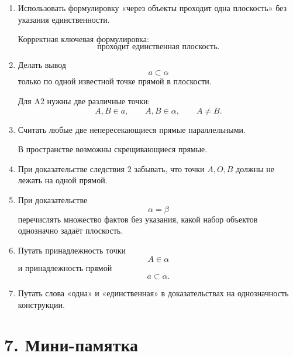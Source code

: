 \documentclass[a4paper,12pt]{article}
\begin{document}
\begin{enumerate}
    \item
    Использовать формулировку
    «через объекты проходит одна плоскость»
    без указания единственности.

    Корректная ключевая формулировка:
    \[
    \boxed{\text{проходит единственная плоскость}}.
    \]

    \item
    Делать вывод
    \[
    a\subset\alpha
    \]
    только по одной известной точке прямой в плоскости.

    Для A2 нужны две различные точки:
    \[
    A,B\in a,
    \qquad
    A,B\in\alpha,
    \qquad
    A\ne B.
    \]

    \item
    Считать любые две непересекающиеся прямые
    параллельными.

    В пространстве возможны скрещивающиеся прямые.

    \item
    При доказательстве следствия 2 забывать,
    что точки $A,O,B$ должны не лежать на одной прямой.

    \item
    При доказательстве
    \[
    \alpha=\beta
    \]
    перечислять множество фактов без указания,
    какой набор объектов однозначно задаёт плоскость.

    \item
    Путать принадлежность точки
    \[
    A\in\alpha
    \]
    и принадлежность прямой
    \[
    a\subset\alpha.
    \]

    \item
    Путать слова «одна» и «единственная»
    в доказательствах на однозначность конструкции.
\end{enumerate}


\section*{7. Мини-памятка}
\end{document}
